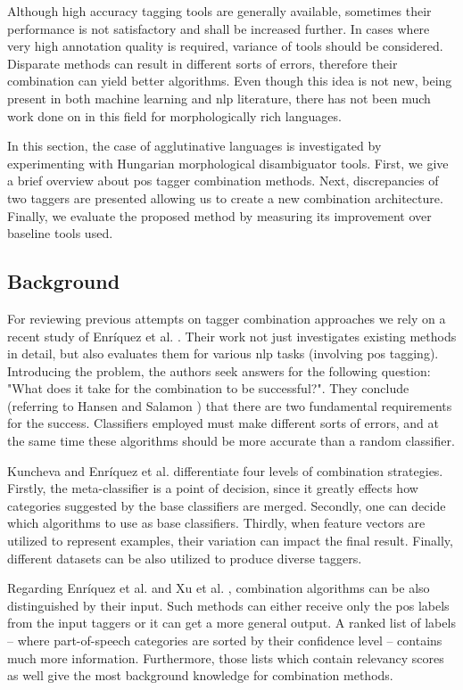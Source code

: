 Although high accuracy tagging tools are generally available, sometimes their performance is not satisfactory and shall be increased further.
In cases where very high annotation quality is required, variance of tools should be considered.
Disparate methods can result in different sorts of errors, therefore their combination can yield better algorithms.
Even though this idea is not new, being present in both machine learning and \acrshort{nlp} literature, there has not been much work done on in this field for morphologically rich languages. 

In this section, the case of agglutinative languages is investigated by experimenting with Hungarian morphological disambiguator tools.
First, we give a brief overview about \acrshort{pos} tagger combination methods.
Next, discrepancies of two taggers are presented allowing us to create a new combination architecture.
Finally, we evaluate the proposed method by measuring its improvement over baseline tools used.

\subsection{Background}

For reviewing previous attempts on tagger combination approaches we rely on a recent study of Enríquez et al. \cite{Enriquez2013study}.
Their work not just investigates existing methods in detail, but also evaluates them for various  \acrshort{nlp} tasks (involving \acrshort{pos} tagging). 
Introducing the problem, the authors seek answers for the following question:
"What does it take for the combination to be successful?".
They conclude (referring to Hansen and Salamon \cite{Hansen1990}) that there are two fundamental requirements for the success. 
Classifiers employed must make different sorts of errors, and at the same time these algorithms should be more accurate than a random classifier.

Kuncheva \cite{Kuncheva2004} and Enríquez et al. \cite{Enriquez2013study} differentiate four levels of combination strategies. 
Firstly, the meta-classifier is a point of decision, since it greatly effects how categories suggested by the base classifiers are merged. 
Secondly, one can decide which algorithms to use as base classifiers.
Thirdly, when feature vectors are utilized to represent examples, their variation can impact the final result.
Finally, different datasets can be also utilized to produce diverse taggers.

Regarding Enríquez et al. \cite{Enriquez2013study} and Xu et al. \cite{Xu1992}, combination algorithms can be also distinguished by their input.
Such methods can either receive only the \acrshort{pos} labels from the input taggers or it can get a more general output. 
A ranked list of labels -- where part-of-speech categories are sorted by their confidence level -- contains much more information. 
Furthermore,  those lists which contain relevancy scores as well give the most background knowledge for combination methods.

